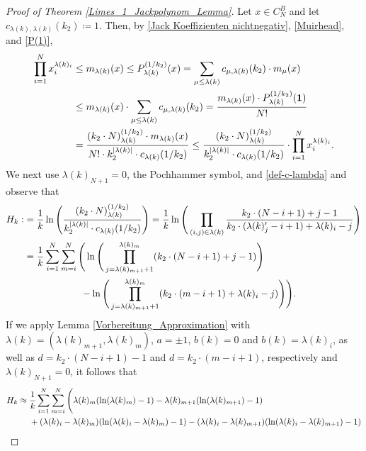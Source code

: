 \documentclass[reqno]{amsart}
\theoremstyle{plain}
\theoremstyle{definition}
\numberwithin{equation}{section}
\begin{document}
\begin{proof}[Proof of Theorem \ref{Limes_1_Jackpolynom_Lemma}]
  Let $x \in C_N^B$ and let $c_{\lambda(k),\lambda(k)}(k_2) \coloneqq 1$. Then,  by \eqref{Jack Koeffizienten nichtnegativ}, \eqref{Muirhead}, and
  \eqref{P(1)},
\begin{align}\label{Abschaetzung Jack}
  \prod\limits_{i=1}^N x_i^{\lambda(k)_i}
  &\leq  m_{\lambda(k)}(x) \leq P_{\lambda(k)}^{(1/k_2)}(x) = \sum\limits_{\mu \leq \lambda(k)} c_{\mu,\lambda(k)}(k_2) \cdot m_{\mu}(x) \notag\\
  &\leq m_{\lambda(k)}(x) \cdot \sum\limits_{\mu \leq \lambda(k)} c_{\mu,\lambda(k)}(k_2) 
  = \frac{m_{\lambda(k)}(x) \cdot P^{(1/k_2)}_{\lambda(k)}({\bf 1})}{N!}\notag\\ &= \frac{(k_2 \cdot N)_{\lambda(k)}^{(1/k_2)} \cdot m_{\lambda(k)}(x)}{N! \cdot k_2^{|\lambda(k)|} \cdot c_{\lambda(k)}(1/k_2)} 
  \leq \frac{(k_2 \cdot N)_{\lambda(k)}^{(1/k_2)}}{k_2^{|\lambda(k)|} \cdot c_{\lambda(k)}(1/k_2)} \cdot \prod\limits_{i=1}^N x_i^{\lambda(k)_i}.
\end{align}
We next use $\lambda(k)_{N+1}=0$, the Pochhammer symbol, and \eqref{def-c-lambda} and observe that
\begin{align}
H_k:&=\frac{1}{k} \ln \Bigg(  \frac{(k_2 \cdot N)_{\lambda(k)}^{(1/k_2)}}{k_2^{|\lambda(k)|} \cdot c_{\lambda(k)}(1/k_2)}\Bigg)
= \frac{1}{k}\ln \Bigg( \prod\limits_{(i,j) \in \lambda(k)} \frac{k_2 \cdot (N-i+1) + j - 1}{k_2 \cdot (\lambda(k)_j'-i+1) +\lambda(k)_i-j}  \Bigg) \notag\\
&=  \frac{1}{k} \sum\limits_{i=1}^N \sum\limits_{m=i}^N \Bigg( \ln \Bigg(  \prod\limits_{j=\lambda(k)_{m+1}+1}^{\lambda(k)_m} (k_2 \cdot (N-i+1) + j - 1)  \Bigg)  \notag\\
&\quad\quad\quad\quad\quad\quad - \ln \Bigg( \prod\limits_{j=\lambda(k)_{m+1}+1}^{\lambda(k)_m} (k_2 \cdot (m-i+1) +\lambda(k)_i-j) \Bigg) \Bigg).
 \notag\end{align}
If we apply Lemma \ref{Vorbereitung_Approximation}
with $\lambda(k) = (\lambda(k)_{m+1},\lambda(k)_m)$, $a = \pm 1$,  $b(k)= 0$ and $b(k)= \lambda(k)_i$,
as well as $d = k_2 \cdot (N-i+1)-1$ and $d = k_2 \cdot (m-i+1)$, respectively and  $\lambda(k)_{N+1}=0$, it follows that
\begin{align}
H_k
&\approx \frac{1}{k} \sum\limits_{i=1}^N  \sum\limits_{m=i}^N \Bigg(\lambda(k)_m (\ln(\lambda(k)_m)-1)-\lambda(k)_{m+1} (\ln(\lambda(k)_{m+1})-1) \notag\\
&\>\>\>\>\>\> + (\lambda(k)_i - \lambda(k)_m) (\ln(\lambda(k)_i-\lambda(k)_m)-1)-(\lambda(k)_i-\lambda(k)_{m+1}) (\ln(\lambda(k)_i-\lambda(k)_{m+1})-1)

\end{align}
\end{proof}
\end{document}
